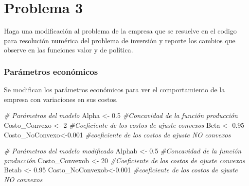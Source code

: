 \documentclass[
]{book}
\author{}
\date{\vspace{-2.5em}}
\newenvironment{Shaded}{\begin{snugshade}}{\end{snugshade}}
\newcommand{\CommentTok}[1]{\textcolor[rgb]{0.56,0.35,0.01}{\textit{#1}}}
\newcommand{\DecValTok}[1]{\textcolor[rgb]{0.00,0.00,0.81}{#1}}
\newcommand{\FloatTok}[1]{\textcolor[rgb]{0.00,0.00,0.81}{#1}}
\newcommand{\NormalTok}[1]{#1}
\newcommand{\OtherTok}[1]{\textcolor[rgb]{0.56,0.35,0.01}{#1}}
\begin{document}
\frontmatter

\mainmatter
\hypertarget{problema-3}{%
\chapter{Problema 3}\label{problema-3}}

Haga una modificación al problema de la empresa que se resuelve en el
codigo para resolución numérica del problema de inversión y reporte los
cambios que observe en las funciones valor y de política.

\hypertarget{paruxe1metros-econuxf3micos}{%
\subsection{Parámetros económicos}\label{paruxe1metros-econuxf3micos}}

Se modifican los parámetros económicos para ver el comportamiento de la
empresa con variaciones en sus costos.

\begin{Shaded}
\begin{Highlighting}[]
\CommentTok{\# Parámetros del modelo}
\NormalTok{Alpha }\OtherTok{\textless{}{-}} \FloatTok{0.5}  \CommentTok{\#Concavidad de la función producción}
\NormalTok{Costo\_Convexo }\OtherTok{\textless{}{-}} \DecValTok{2}  \CommentTok{\#Coeficiente de los costos de ajuste convexos}
\NormalTok{Beta }\OtherTok{\textless{}{-}} \FloatTok{0.95}
\NormalTok{Costo\_NoConvexo}\OtherTok{\textless{}{-}}\FloatTok{0.001}  \CommentTok{\#coeficiente de los costos de ajuste NO convexos}
\end{Highlighting}
\end{Shaded}

\begin{Shaded}
\begin{Highlighting}[]
\CommentTok{\# Parámetros del modelo modificado}
\NormalTok{Alphab }\OtherTok{\textless{}{-}} \FloatTok{0.5}  \CommentTok{\#Concavidad de la función producción}
\NormalTok{Costo\_Convexob }\OtherTok{\textless{}{-}} \DecValTok{20}  \CommentTok{\#Coeficiente de los costos de ajuste convexos}
\NormalTok{Betab }\OtherTok{\textless{}{-}} \FloatTok{0.95}
\NormalTok{Costo\_NoConvexob}\OtherTok{\textless{}{-}}\FloatTok{0.001}  \CommentTok{\#coeficiente de los costos de ajuste NO convexos}
\end{Highlighting}
\end{Shaded}
\end{document}
